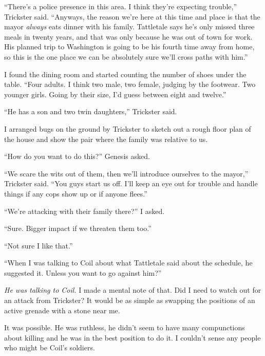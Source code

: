 ``There's a police presence in this area.  I think they're expecting trouble,'' Trickster said.  ``Anyways, the reason we're here at this time and place is that the mayor \emph{always} eats dinner with his family.  Tattletale says he's only missed three meals in twenty years, and that was only because he was out of town for work.  His planned trip to Washington is going to be his fourth time away from home, so this is the one place we can be absolutely sure we'll cross paths with him.''



I found the dining room and started counting the number of shoes under the table.  ``Four adults.  I think two male, two female, judging by the footwear.  Two younger girls. Going by their size, I'd guess between eight and twelve.''



``He has a son and two twin daughters,'' Trickster said.



I arranged bugs on the ground by Trickster to sketch out a rough floor plan of the house and show the pair where the family was relative to us.



``How do you want to do this?'' Genesis asked.



``We scare the wits out of them, then we'll introduce ourselves to the mayor,'' Trickster said.  ``You guys start us off.  I'll keep an eye out for trouble and handle things if any cops show up or if anyone flees.''



``We're attacking with their family there?'' I asked.



``Sure.  Bigger impact if we threaten them too.''



``Not sure I like that.''



``When I was talking to Coil about what Tattletale said about the schedule, he suggested it.  Unless you want to go against him?''



\emph{He was talking to Coil.  }I made a mental note of that.  Did I need to watch out for an attack from Trickster?  It would be as simple as swapping the positions of an active grenade with a stone near me.



It was possible.  He was ruthless, he didn't seem to have many compunctions about killing and he was in the best position to do it.  I couldn't sense any people who might be Coil's soldiers.



